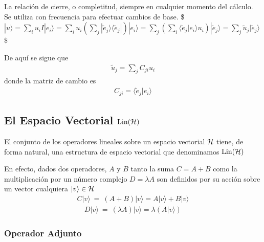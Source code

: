 \documentclass[letterpaper,10pt,english]{jupyterBook}
\newcommand{\ket}[1]{|#1\rangle}
\newcommand{\braket}[2]{\langle #1|#2\rangle}
\newcommand{\ketbra}[2]{| #1\rangle \langle #2 |}
\newcommand{\Hil}{{\cal H}}
\newcommand{\Lin}{\hbox{Lin}}
\begin{document}
\sphinxAtStartPar
La relación de cierre, o completitud,  siempre  en cualquier momento del cálculo. Se utiliza con frecuencia para efectuar cambios de base.
\$\(
\ket{u}  =  \sum_i u_i  I \ket{e_i} =  \sum_i   u_i \left(\sum_j\ketbra{\tilde e_j}{\tilde e_j} \right)\ket{e_i} =\sum_j \left( \sum_i \braket{\tilde e_j}{e_i} u_i \right) \ket{\tilde e_j}
= \sum_j \tilde u_j \ket{\tilde e_j}
\)\$

\sphinxAtStartPar
De aquí se sigue que
\begin{equation*}
\begin{split}
\tilde u_j  = \sum_j C_{ji} u_i 
\end{split}
\end{equation*}
\sphinxAtStartPar
donde la matriz de cambio es
\begin{equation*}
\begin{split}
C_{ji} = \braket{\tilde e_j}{e_i} 
\end{split}
\end{equation*}

\subsection{El Espacio Vectorial \protect\(\Lin(\Hil)\protect\)}
\label{\detokenize{docs/Part_01_Formalismo/Chapter_01_02_Formalismo_matem_xe1tico/01_03_Operadores_myst:el-espacio-vectorial-lin-hil}}
\sphinxAtStartPar
El conjunto de  los operadores lineales sobre un espacio vectorial \(\Hil\) tiene, de forma natural, una estructura de espacio vectorial que denominamos \(\Lin(\Hil)\)

\sphinxAtStartPar
En efecto, dados dos operadores,  \(A\) y \(B\) tanto la suma \(C = A+B\) como la multiplicación por un número complejo \(D=\lambda A\) son  definidos por su acción sobre un vector cualquiera \(\ket{v}\in \Hil\)
\begin{equation*}
\begin{split}
C\ket{v} ~=~ (A + B) \ket{v} = A\ket{v} + B\ket{v}
\end{split}
\end{equation*}\begin{equation*}
\begin{split}
D\ket{v} ~=~ (\lambda A) \ket{v} = \lambda (A\ket{v})
\end{split}
\end{equation*}

\subsubsection{Operador Adjunto}
\label{\detokenize{docs/Part_01_Formalismo/Chapter_01_02_Formalismo_matem_xe1tico/01_03_Operadores_myst:operador-adjunto}}
\sphinxAtStartPar
\end{document}
